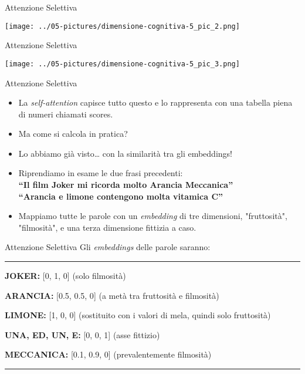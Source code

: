 \documentclass[aspectratio=169]{beamer}
\begin{document}
%
%
\begin{frame}{Attenzione Selettiva}
\begin{center}
\texttt{[image: ../05-pictures/dimensione-cognitiva-5\_pic\_2.png]} 
\end{center}
\end{frame}
%
%
\begin{frame}{Attenzione Selettiva}
\begin{center}
\texttt{[image: ../05-pictures/dimensione-cognitiva-5\_pic\_3.png]} 
\end{center}
\end{frame}
%
%
\begin{frame}{Attenzione Selettiva}
\begin{itemize}
\item La \emph{self-attention} capisce tutto questo e lo rappresenta con una tabella piena di numeri chiamati scores. 
\item Ma come si calcola in pratica?
\item Lo abbiamo già visto\ldots{} con la similarità tra gli embeddings!
\item Riprendiamo in esame le due frasi precedenti:\\

\textbf{``Il film Joker mi ricorda molto Arancia Meccanica''}\\

\textbf{``Arancia e limone contengono molta vitamica C''}

\item Mappiamo tutte le parole con un \emph{embedding} di tre dimensioni,
"fruttosità", "filmosità", e una terza dimensione fittizia a caso.
\end{itemize}
\end{frame}
%
%
\begin{frame}{Attenzione Selettiva}
Gli \emph{embeddings} delle parole saranno:\\
\vspace{0.5cm}
\begin{center}\rule{0.5\linewidth}{0.5pt}\end{center}

\textbf{JOKER:} {[}0, 1, 0{]} (solo filmosità)

\textbf{ARANCIA:} {[}0.5, 0.5, 0{]} (a metà tra fruttosità e filmosità)

\textbf{LIMONE:} {[}1, 0, 0{]} (sostituito con i valori di mela, quindi
solo fruttosità)

\textbf{UNA, ED, UN, E:} {[}0, 0, 1{]} (asse fittizio)

\textbf{MECCANICA:} {[}0.1, 0.9, 0{]} (prevalentemente filmosità)

\begin{center}\rule{0.5\linewidth}{0.5pt}\end{center}
\end{frame}
\end{document}

